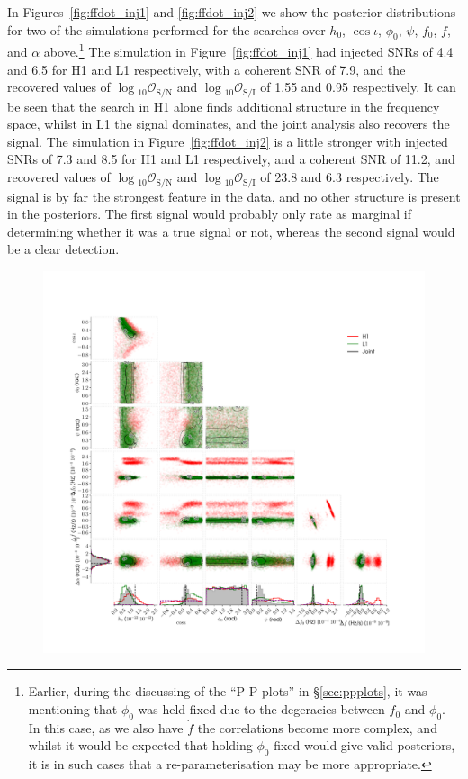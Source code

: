 In Figures~\ref{fig:ffdot_inj1} and \ref{fig:ffdot_inj2} we show the posterior distributions for two of the simulations performed for the searches over
$h_0$, $\cos{\iota}$, $\phi_0$, $\psi$, $f_0$, $\dot{f}$, and $\alpha$ above.\footnote{Earlier, during the discussing of the ``P-P plots'' in \S\ref{sec:ppplots},
it was mentioning that $\phi_0$ was held fixed due to the degeracies between $f_0$ and $\phi_0$. In this case, as we also have $\dot{f}$ the correlations
become more complex, and whilst it would be expected that holding $\phi_0$ fixed would give valid posteriors, it is in such cases that a re-parameterisation
may be more appropriate.} The simulation in Figure~\ref{fig:ffdot_inj1} had injected SNRs of 4.4 and 6.5 for H1
and L1 respectively, with a coherent SNR of 7.9, and the recovered values of $\log{}_{10}\mathcal{O}_{\text{S}/\text{N}}$ and
$\log{}_{10}\mathcal{O}_{\text{S}/\text{I}}$ of 1.55 and 0.95 respectively. It can be seen that the search in H1 alone finds additional structure
in the frequency space, whilst in L1 the signal dominates, and the joint analysis also recovers the signal. The simulation in Figure~\ref{fig:ffdot_inj2}
is a little stronger with injected SNRs of 7.3 and 8.5 for H1 and L1 respectively, and a coherent SNR of 11.2, and recovered values of 
$\log{}_{10}\mathcal{O}_{\text{S}/\text{N}}$ and $\log{}_{10}\mathcal{O}_{\text{S}/\text{I}}$ of 23.8 and 6.3 respectively. The signal is by far the strongest
feature in the data, and no other structure is present in the posteriors. The first signal would probably only rate as marginal if determining whether it was
a true signal or not, whereas the second signal would be a clear detection.

\begin{figure}[!phtb]
\begin{center}
\includegraphics[width=1\columnwidth]{./figures/codeeval/simulations/signal_freq/one/ffdot_inj1}
\caption{ \protect}
\end{center}
\end{figure}


